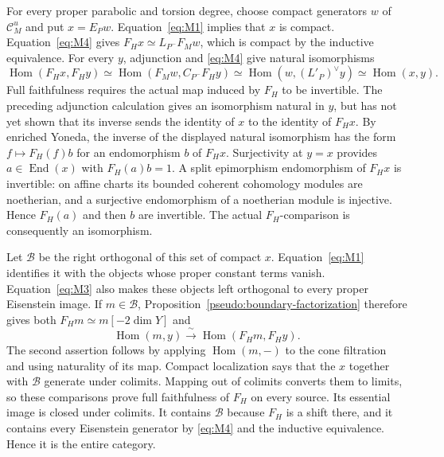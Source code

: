 For every proper parabolic and torsion degree, choose compact generators
$w$ of $\mathcal C_M^u$ and put $x=E_Pw$.  Equation~\eqref{eq:M1} implies
that $x$ is compact.  Equation~\eqref{eq:M4} gives
$F_Hx\simeq L_{P^-}F_Mw$, which is compact by the inductive equivalence.
For every $y$, adjunction and \eqref{eq:M4} give natural isomorphisms
\[
 \operatorname{Hom}(F_Hx,F_Hy)
 \simeq \operatorname{Hom}(F_Mw,C_{P^-}F_Hy)
 \simeq \operatorname{Hom}(w,(L'_P)^\vee y)
 \simeq \operatorname{Hom}(x,y).
\]
Full faithfulness requires the actual map induced by $F_H$ to be
invertible.  The preceding adjunction calculation gives an isomorphism
natural in $y$, but has not yet shown that its inverse sends the identity
of $x$ to the identity of $F_Hx$.  By enriched
Yoneda, the inverse of the displayed natural isomorphism has the form
$f\mapsto F_H(f)b$ for an endomorphism $b$ of $F_Hx$.  Surjectivity at $y=x$
provides $a\in\operatorname{End}(x)$ with $F_H(a)b=1$.  A split epimorphism
endomorphism of $F_Hx$ is invertible: on affine charts its bounded coherent
cohomology modules are noetherian, and a surjective endomorphism of a
noetherian module is injective.  Hence $F_H(a)$ and then $b$ are invertible.
The actual $F_H$-comparison is consequently an isomorphism.

Let $\mathcal B$ be the right orthogonal of this set of compact $x$.
Equation~\eqref{eq:M1} identifies it with the objects whose proper
constant terms vanish.  Equation~\eqref{eq:M3} also makes these objects
left orthogonal to every proper Eisenstein image.  If $m\in\mathcal B$,
Proposition~\ref{pseudo:boundary-factorization} therefore gives both
$F_Hm\simeq m[-2\dim Y]$ and
\[
 \operatorname{Hom}(m,y)\xrightarrow{\ \sim\ }
 \operatorname{Hom}(F_Hm,F_Hy).
\]
The second assertion follows by applying $\operatorname{Hom}(m,-)$ to
the cone filtration and using naturality of its map.  Compact localization
says that the $x$ together with $\mathcal B$ generate under colimits.
Mapping out of colimits converts them to limits, so these comparisons
prove full faithfulness of $F_H$ on every source.  Its essential image is
closed under colimits.  It contains $\mathcal B$ because $F_H$ is a shift
there, and it contains every Eisenstein generator by \eqref{eq:M4} and
the inductive equivalence.  Hence it is the entire category.

